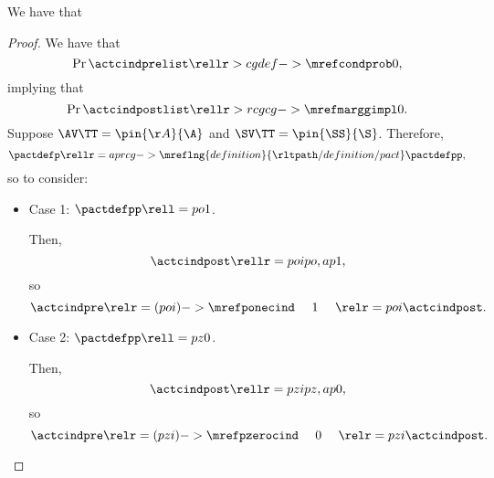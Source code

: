 \begin{proposition}
  We have that %
\end{proposition}

\begin{proof}
  We have that 
  $$\Pr{\actcindprelist} \rellr > cg {def->\mrefcondprob} 0,$$ 
  implying that
  $$\Pr{\actcindpostlist} \rellr > rcg {cg->\mrefmarggimpl} 0.$$
  Suppose 
  $\AV\TT = \pin{\AA}{\A}$
  and
  $\SV\TT = \pin{\SS}{\S}$. Therefore,
  $$\pactdefp \rellr = ap {rcg->\mreflng{definition}{\rltpath/definition/pact}} \pactdefpp,$$
  so  to consider:
  \begin{itemize}
    \item {} Case 1: $\pactdefpp \rell = po 1$.

      Then,
      $$\actcindpost \rellr = poi po,ap 1,$$
      so
      $$\actcindpre \relr = (poi)->{\mrefponecind} \ \ \ \ 1\ \ \ \ \relr = poi \actcindpost.$$
    \item {} Case 2: $\pactdefpp \rell = pz 0$.

      Then,
      $$\actcindpost \rellr = pzi pz,ap 0,$$
      so
      $$\actcindpre \relr = (pzi)->{\mrefpzerocind} \ \ \ \ 0\ \ \ \ \relr = pzi \actcindpost.$$
  \end{itemize}
\end{proof}
